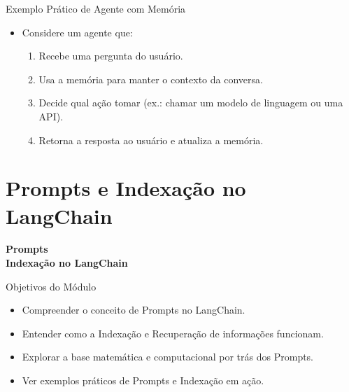 \documentclass{beamer}
\begin{document}
\begin{frame}{Exemplo Prático de Agente com Memória}
\begin{itemize}
    \item Considere um agente que:
    \begin{enumerate}
        \item Recebe uma pergunta do usuário.
        \item Usa a memória para manter o contexto da conversa.
        \item Decide qual ação tomar (ex.: chamar um modelo de linguagem ou uma API).
        \item Retorna a resposta ao usuário e atualiza a memória.
    \end{enumerate}
\end{itemize}
   \centering

\end{frame}



\section{Prompts e Indexação no LangChain}
\begin{frame}
\centering
\Huge
\textbf{Prompts\\Indexação no LangChain}
\end{frame}

\begin{frame}{Objetivos do Módulo}
\begin{itemize}
    \item Compreender o conceito de Prompts no LangChain.
    \item Entender como a Indexação e Recuperação de informações funcionam.
    \item Explorar a base matemática e computacional por trás dos Prompts.
    \item Ver exemplos práticos de Prompts e Indexação em ação.
\end{itemize}
\end{frame}
\end{document}
